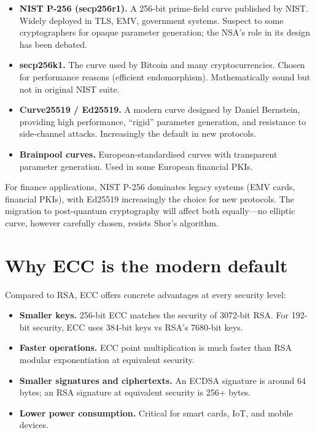 \begin{itemize}
  \item \textbf{NIST P-256 (secp256r1).} A 256-bit prime-field curve published by NIST. Widely deployed in TLS, EMV, government systems. Suspect to some cryptographers for opaque parameter generation; the NSA's role in its design has been debated.
  \item \textbf{secp256k1.} The curve used by Bitcoin and many cryptocurrencies. Chosen for performance reasons (efficient endomorphism). Mathematically sound but not in original NIST suite.
  \item \textbf{Curve25519 / Ed25519.} A modern curve designed by Daniel Bernstein, providing high performance, ``rigid'' parameter generation, and resistance to side-channel attacks. Increasingly the default in new protocols.
  \item \textbf{Brainpool curves.} European-standardised curves with transparent parameter generation. Used in some European financial PKIs.
\end{itemize}

For finance applications, NIST P-256 dominates legacy systems (EMV cards, financial PKIs), with Ed25519 increasingly the choice for new protocols. The migration to post-quantum cryptography will affect both equally---no elliptic curve, however carefully chosen, resists Shor's algorithm.

\section{Why ECC is the modern default}

Compared to RSA, ECC offers concrete advantages at every security level:

\begin{itemize}
  \item \textbf{Smaller keys.} 256-bit ECC matches the security of 3072-bit RSA. For 192-bit security, ECC uses 384-bit keys vs RSA's 7680-bit keys.
  \item \textbf{Faster operations.} ECC point multiplication is much faster than RSA modular exponentiation at equivalent security.
  \item \textbf{Smaller signatures and ciphertexts.} An ECDSA signature is around 64 bytes; an RSA signature at equivalent security is 256+ bytes.
  \item \textbf{Lower power consumption.} Critical for smart cards, IoT, and mobile devices.
\end{itemize}

